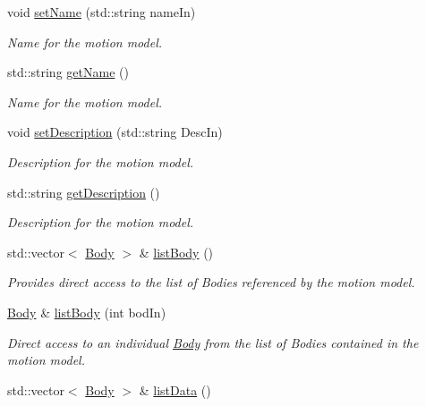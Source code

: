 \begin{DoxyCompactItemize}
void \hyperlink{classosea_1_1ofreq_1_1_motion_model_a42d989727028c18c59ba04f958bc7b74}{set\-Name} (std\-::string name\-In)
\begin{DoxyCompactList}\small\item\em Name for the motion model. \end{DoxyCompactList}\item 
std\-::string \hyperlink{classosea_1_1ofreq_1_1_motion_model_af9fd1e58735b7f47bc5d5257bdca9139}{get\-Name} ()
\begin{DoxyCompactList}\small\item\em Name for the motion model. \end{DoxyCompactList}\item 
void \hyperlink{classosea_1_1ofreq_1_1_motion_model_a5097540bb98ad753594d41890e6ef30d}{set\-Description} (std\-::string Desc\-In)
\begin{DoxyCompactList}\small\item\em Description for the motion model. \end{DoxyCompactList}\item 
std\-::string \hyperlink{classosea_1_1ofreq_1_1_motion_model_a8594356137407b25d03927a68a422dc9}{get\-Description} ()
\begin{DoxyCompactList}\small\item\em Description for the motion model. \end{DoxyCompactList}\item 
std\-::vector$<$ \hyperlink{classosea_1_1ofreq_1_1_body}{Body} $>$ \& \hyperlink{classosea_1_1ofreq_1_1_motion_model_a67ad0e6b993a20af61170cdebe8f418f}{list\-Body} ()
\begin{DoxyCompactList}\small\item\em Provides direct access to the list of Bodies referenced by the motion model. \end{DoxyCompactList}\item 
\hyperlink{classosea_1_1ofreq_1_1_body}{Body} \& \hyperlink{classosea_1_1ofreq_1_1_motion_model_a3c08da3c6cb3e959b53f2cf6f614d3c0}{list\-Body} (int bod\-In)
\begin{DoxyCompactList}\small\item\em Direct access to an individual \hyperlink{classosea_1_1ofreq_1_1_body}{Body} from the list of Bodies contained in the motion model. \end{DoxyCompactList}\item 
std\-::vector$<$ \hyperlink{classosea_1_1ofreq_1_1_body}{Body} $>$ \& \hyperlink{classosea_1_1ofreq_1_1_motion_model_ae63712716bcaff9ff263d9728f39323a}{list\-Data} ()

\end{DoxyCompactItemize}
